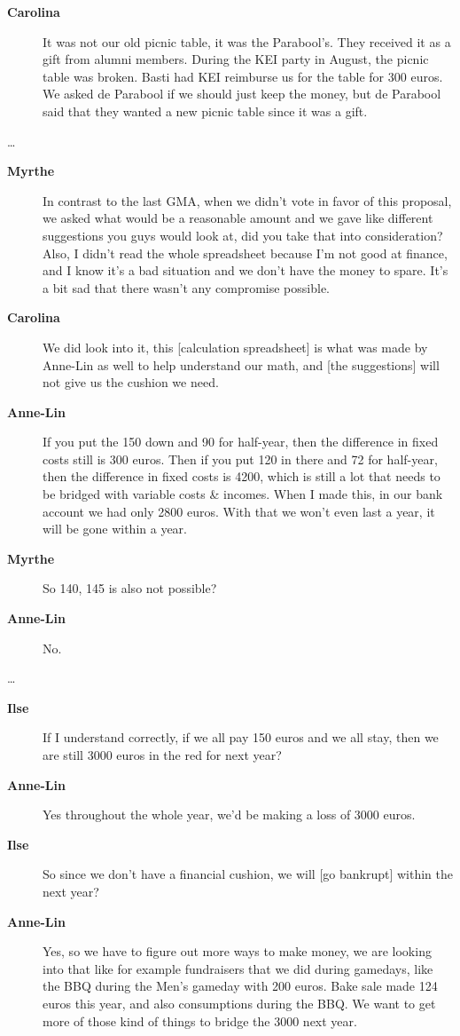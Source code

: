 \documentclass[12pt, a4paper]{article}
\newcommand{\speak}[2]{\begin{description}\item[\textbf{#1}]#2\end{description}}
\begin{document}
\speak{Carolina}{It was not our old picnic table, it was the Parabool's. They received it as a gift from alumni members. During the KEI party in August, the picnic table was broken. Basti had KEI reimburse us for the table for 300 euros. We asked de Parabool if we should just keep the money, but de Parabool said that they wanted a new picnic table since it was a gift.}

\dots

\speak{Myrthe}{In contrast to the last GMA, when we didn't vote in favor of this proposal, we asked what would be a reasonable amount and we gave like different suggestions you guys would look at, did you take that into consideration? Also, I didn't read the whole spreadsheet because I'm not good at finance, and I know it's a bad situation and we don't have the money to spare. It's a bit sad that there wasn't any compromise possible.}

\speak{Carolina}{We did look into it, this [calculation spreadsheet] is what was made by Anne-Lin as well to help understand our math, and [the suggestions] will not give us the cushion we need.}

\speak{Anne-Lin}{If you put the 150 down and 90 for half-year, then the difference in fixed costs still is 300 euros. Then if you put 120 in there and 72 for half-year, then the difference in fixed costs is 4200, which is still a lot that needs to be bridged with variable costs \& incomes. When I made this, in our bank account we had only 2800 euros. With that we won't even last a year, it will be gone within a year.}

\speak{Myrthe}{So 140, 145 is also not possible?}

\speak{Anne-Lin}{No.}

\dots

\speak{Ilse}{If I understand correctly, if we all pay 150 euros and we all stay, then we are still 3000 euros in the red for next year?}

\speak{Anne-Lin}{Yes throughout the whole year, we'd be making a loss of 3000 euros.}

\speak{Ilse}{So since we don't have a financial cushion, we will [go bankrupt] within the next year?}

\speak{Anne-Lin}{Yes, so we have to figure out more ways to make money, we are looking into that like for example fundraisers that we did during gamedays, like the BBQ during the Men's gameday with 200 euros. Bake sale made 124 euros this year, and also consumptions during the BBQ. We want to get more of those kind of things to bridge the 3000 next year.}
\end{document}
